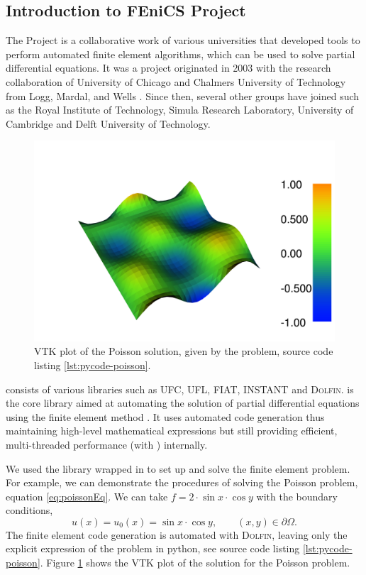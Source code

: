 \subsection{Introduction to FEniCS Project}

The \fenics Project is a collaborative work of various universities that developed tools to perform automated finite element algorithms, which can be used to solve partial differential equations. It was a project originated in 2003 with the research collaboration of University of Chicago and Chalmers University of Technology from Logg,  Mardal, and Wells \cite{Logg2012b}. Since then, several other groups have joined such as the Royal Institute of Technology, Simula Research Laboratory, University of Cambridge and Delft University of Technology.

	\begin{figure}[!h]
	\centering
	\includegraphics[width=0.5\linewidth]{./figures/eulerian/dolfin_plot_2-rotated270.png}
	\caption{\dolfin VTK plot of the Poisson solution, given by the problem, source code listing \ref{lst:pycode-poisson}.}
	\label{fig:dolfinExampleFigure}
	\end{figure}

\fenics consists of various libraries such as UFC, UFL, FIAT, INSTANT and \textsc{Dolfin}. \dolfin is the core library aimed at automating the solution of partial differential equations using the finite element method \cite{Logg2010a}. It uses automated code generation thus maintaining high-level mathematical expressions but still providing efficient, multi-threaded performance (with ) internally. %

We used the \dolfin library wrapped in \python to set up and solve the finite element problem. For example, we can demonstrate the procedures of solving the Poisson problem, equation \ref{eq:poissonEq}. We can take $f=2\cdot\sin{x}\cdot\cos{y}$ with the boundary conditions,
	\begin{equation}
	u(x) = u_0(x) = \sin x \cdot \cos y, \qquad (x,y) \in \partial\Omega.
	\end{equation}
The finite element code generation is automated with \textsc{Dolfin}, leaving only the explicit expression of the problem in python, see source code listing \ref{lst:pycode-poisson}. Figure \ref{fig:dolfinExampleFigure} shows the VTK plot of the solution for the Poisson problem.

